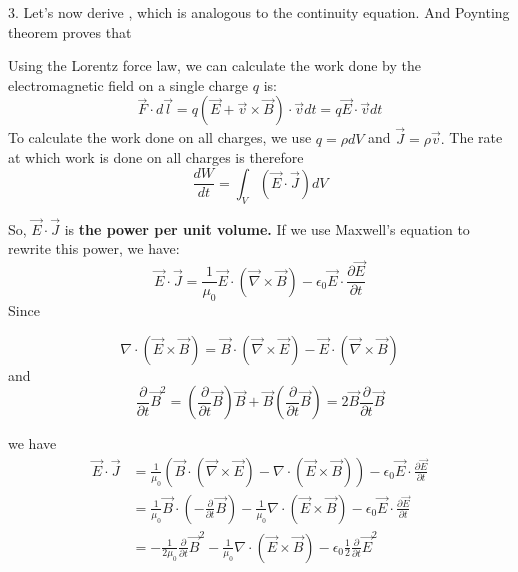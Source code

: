 3. Let's now derive , which is analogous to the continuity equation. And Poynting theorem proves that \textbf{}

Using the Lorentz force law, we can calculate the work done by the electromagnetic field on a single charge $q$ is:
$$
\vec{F} \cdot d \vec{l}=q(\vec{E}+\vec{v} \times \vec{B}) \cdot \vec{v} d t=q \vec{E} \cdot \vec{v} d t
$$
To calculate the work done on all charges, we use $q=\rho d V$ and $\vec{J}=\rho \vec{v} .$ The rate at which work is done on all charges is therefore
\begin{equation}
    \frac{d W}{d t}=\int_{V}(\vec{E} \cdot \vec{J}) d V
    \label{powerPerVol}
\end{equation}


So, $\vec{E} \cdot \vec{J}$ is \textbf{the power per unit volume.} If we use Maxwell's equation to rewrite this power, we have:
$$
\vec{E} \cdot \vec{J}=\frac{1}{\mu_{0}} \vec{E} \cdot(\vec{\nabla} \times \vec{B})-\epsilon_{0} \vec{E} \cdot \frac{\partial \vec{E}}{\partial t}
$$
Since
\begin{qt}
\begin{equation}
\nabla \cdot(\vec{E} \times \vec{B})=\vec{B} \cdot(\vec{\nabla} \times \vec{E})-\vec{E} \cdot(\vec{\nabla} \times \vec{B})
\end{equation}
and
\begin{equation}
\frac{\partial}{\partial t} \vec{B}^{2}=\left(\frac{\partial}{\partial t} \vec{B}\right) \vec{B}+\vec{B}\left(\frac{\partial}{\partial t} \vec{B}\right)= 2 \vec{B} \frac{\partial}{\partial t} \vec{B}
\end{equation}
\end{qt}
we have
\begin{equation}
\begin{aligned}
\vec{E} \cdot \vec{J}&=\frac{1}{\mu_{0}}(\vec{B} \cdot(\vec{\nabla} \times \vec{E})-\nabla \cdot(\vec{E} \times \vec{B}))-\epsilon_{0} \vec{E} \cdot \frac{\partial \vec{E}}{\partial t}\\
&=\frac{1}{\mu_{0}} \vec{B} \cdot\left(-\frac{\partial}{\partial t} \vec{B}\right)-\frac{1}{\mu_{0}} \nabla \cdot(\vec{E} \times \vec{B})-\epsilon_{0} \vec{E} \cdot \frac{\partial \vec{E}}{\partial t}\\
&=-\frac{1}{2 \mu_{0}} \frac{\partial}{\partial t} \vec{B}^{2}-\frac{1}{\mu_{0}} \nabla \cdot(\vec{E} \times \vec{B})-\epsilon_{0} \frac{1}{2} \frac{\partial}{\partial t} \vec{E}^{2}
\end{aligned}
\end{equation}
